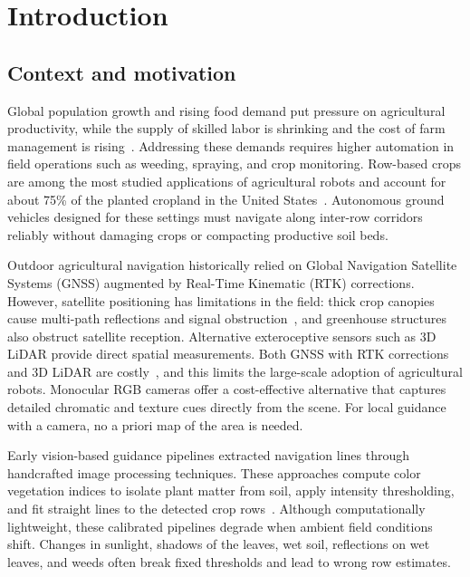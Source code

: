 \chapter{Introduction}
\label{cap:introduction}

\section{Context and motivation}
\label{sec:context}

Global population growth and rising food demand put pressure on agricultural productivity, while the supply of skilled labor is shrinking and the cost of farm management is rising~\cite{bai2023vision,desilva2024rowdetection}. Addressing these demands requires higher automation in field operations such as weeding, spraying, and crop monitoring. Row-based crops are among the most studied applications of agricultural robots and account for about 75\% of the planted cropland in the United States~\cite{navone2025gpsfree}. Autonomous ground vehicles designed for these settings must navigate along inter-row corridors reliably without damaging crops or compacting productive soil beds.

Outdoor agricultural navigation historically relied on Global Navigation Satellite Systems (GNSS) augmented by Real-Time Kinematic (RTK) corrections. However, satellite positioning has limitations in the field: thick crop canopies cause multi-path reflections and signal obstruction~\cite{navone2025gpsfree}, and greenhouse structures also obstruct satellite reception. Alternative exteroceptive sensors such as 3D LiDAR provide direct spatial measurements. Both GNSS with RTK corrections and 3D LiDAR are costly~\cite{navone2025gpsfree}, and this limits the large-scale adoption of agricultural robots. Monocular RGB cameras offer a cost-effective alternative that captures detailed chromatic and texture cues directly from the scene. For local guidance with a camera, no a priori map of the area is needed.

Early vision-based guidance pipelines extracted navigation lines through handcrafted image processing techniques. These approaches compute color vegetation indices to isolate plant matter from soil, apply intensity thresholding, and fit straight lines to the detected crop rows~\cite{bai2023vision,mendez2023vineyards}. Although computationally lightweight, these calibrated pipelines degrade when ambient field conditions shift. Changes in sunlight, shadows of the leaves, wet soil, reflections on wet leaves, and weeds often break fixed thresholds and lead to wrong row estimates.

